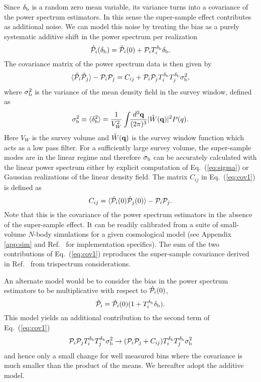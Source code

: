 \documentclass[prd,twocolumn,amsmath,amssymb,floatfix,superscriptaddress]{revtex4-1}
\newcommand{\bq}{{\bf q}}
\newcommand{\br}{{\rm b}}
\newcommand{\Dv}{{\cal P}}
\begin{document}
{Since $\delta_\br$ is 
a random zero mean variable, its variance turns into a 
 covariance of the power spectrum estimators. 
  In this
 sense the super-sample effect contributes as additional noise.  We can model this noise
 by treating the bias as a purely
systematic additive shift in the power spectrum per realization
\begin{equation}
\hat \Dv_i(\delta_\br) = \hat \Dv_i(0) + \Dv_i  T^{\delta_\br}_i 
\delta_\br.
\label{eq:model}
\end{equation}
The covariance {matrix} of the power spectrum data
is then
given by 
\begin{equation}
\langle \hat \Dv_i \hat \Dv_j \rangle -\Dv_i \Dv_j  
= C_{ij} +\Dv_i  \Dv_j T^{\delta_\br}_i  T^{\delta_\br}_j  \sigma_\br^2,
\label{eq:cov1}
\end{equation}
%
where $\sigma^2_\br$ is the variance of the mean density field in the
survey window, defined as
%
\begin{equation}
\sigma_\br^2 \equiv  \langle \delta_\br^2 \rangle
=\frac{1}{V_W^2}\int\!\!\frac{d^3\bq}{(2\pi)^3}|\tilde{W}(\bq)|^2
{P(q).}
\label{eq:sigma}
\end{equation}
%
{Here $V_W$ is the survey volume and
$\tilde{W}(\bq)$ is the survey window function which acts as a low pass
filter.
{For 
 a sufficiently large survey volume, the super-sample modes are in the linear regime
 and therefore
$\sigma_\br$ can be accurately calculated with the linear power spectrum either by explicit computation of Eq.~(\ref{eq:sigma}) or Gaussian realizations of the linear
density field.} 
The matrix $C_{ij}$ in Eq.~(\ref{eq:cov1}) is defined as}
\begin{equation}
C_{ij} =  \langle \hat \Dv_i(0) \hat \Dv_j(0) \rangle - \Dv_i \Dv_j. 
\end{equation}
%
Note that this is the covariance of the power spectrum estimators in the absence of
the super-sample effect.
It  can be readily
calibrated from a suite of small-volume
$N$-body simulations 
for {a}
given cosmological
model \cite{Scoccimarroetal:99,MeiksinWhite:99} (see Appendix \ref{app:sim} and Ref.~\cite{Lietal:14} for implementation specifics). The sum of the two contributions of Eq.~(\ref{eq:cov1})
reproduces the super-sample covariance derived in Ref.~\cite{Lietal:14} from 
trispectrum considerations. 

An alternate model would be to consider the bias {in the power
spectrum estimators}
to be multiplicative with respect to $\hat  \Dv_i(0)$,
\begin{equation}
\hat \Dv_i = \hat \Dv_i(0) (1 +  T^{\delta_\br}_i \delta_\br).
\label{eq:multiplicative}
\end{equation}
{This model yields an additional contribution to the second term of Eq.~(\ref{eq:cov1})
\begin{equation}
\Dv_i  \Dv_j T^{\delta_\br}_i  T^{\delta_\br}_j  \sigma_\br^2 \rightarrow (\Dv_i  \Dv_j + C_{ij}) 
T^{\delta_\br}_i  T^{\delta_\br}_j  \sigma_\br^2 
\end{equation}
and hence only a small change for well measured bins where the covariance
is much smaller than the product of the means.  We hereafter adopt the additive model.}


}
\end{document}
